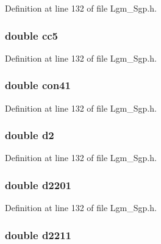 Definition at line 132 of file Lgm\_\-Sgp.h.\hypertarget{struct___sgp_info_02926a7d267c9362ca676c008f4e6c21}{
\subsubsection[{cc5}]{\setlength{\rightskip}{0pt plus 5cm}double {\bf cc5}}}
\label{struct___sgp_info_02926a7d267c9362ca676c008f4e6c21}




Definition at line 132 of file Lgm\_\-Sgp.h.\hypertarget{struct___sgp_info_77fbcbf60585b0d443d82036a943d947}{
\subsubsection[{con41}]{\setlength{\rightskip}{0pt plus 5cm}double {\bf con41}}}
\label{struct___sgp_info_77fbcbf60585b0d443d82036a943d947}




Definition at line 132 of file Lgm\_\-Sgp.h.\hypertarget{struct___sgp_info_13b4e96542fec65c7a11bc18f5a5439e}{
\subsubsection[{d2}]{\setlength{\rightskip}{0pt plus 5cm}double {\bf d2}}}
\label{struct___sgp_info_13b4e96542fec65c7a11bc18f5a5439e}




Definition at line 132 of file Lgm\_\-Sgp.h.\hypertarget{struct___sgp_info_230a89ad405323f2b9926a19395ec04e}{
\subsubsection[{d2201}]{\setlength{\rightskip}{0pt plus 5cm}double {\bf d2201}}}
\label{struct___sgp_info_230a89ad405323f2b9926a19395ec04e}




Definition at line 132 of file Lgm\_\-Sgp.h.\hypertarget{struct___sgp_info_548a2513409777664a0675a48be0c85a}{
\subsubsection[{d2211}]{\setlength{\rightskip}{0pt plus 5cm}double {\bf d2211}}}
\label{struct___sgp_info_548a2513409777664a0675a48be0c85a}




